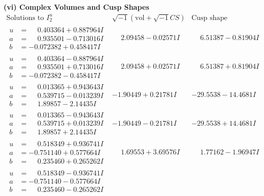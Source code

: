 \documentclass[1p]{elsarticle_modified}
\theoremstyle{definition}
\newcommand{\I}{\sqrt{-1}}
\begin{document}
\newpage\flushleft \textbf{(vi) Complex Volumes and Cusp Shapes}
$$\begin{array}{c|c|c}  
\text{Solutions to }I^u_{2}& \I (\text{vol} + \sqrt{-1}CS) & \text{Cusp shape}\\
 \hline 
\begin{aligned}
u &= \phantom{-}0.403364 + 0.887964 I \\
a &= \phantom{-}0.935501 - 0.713016 I \\
b &= -0.072382 + 0.458417 I\end{aligned}
 & \phantom{-}2.09458 - 0.02571 I & \phantom{-}6.51387 - 0.81904 I \\ \hline\begin{aligned}
u &= \phantom{-}0.403364 - 0.887964 I \\
a &= \phantom{-}0.935501 + 0.713016 I \\
b &= -0.072382 - 0.458417 I\end{aligned}
 & \phantom{-}2.09458 + 0.02571 I & \phantom{-}6.51387 + 0.81904 I \\ \hline\begin{aligned}
u &= \phantom{-}0.013365 + 0.943643 I \\
a &= \phantom{-}0.539715 - 0.013239 I \\
b &= \phantom{-}1.89857 - 2.14435 I\end{aligned}
 & -1.90449 + 0.21781 I & -29.5538 - 14.4681 I \\ \hline\begin{aligned}
u &= \phantom{-}0.013365 - 0.943643 I \\
a &= \phantom{-}0.539715 + 0.013239 I \\
b &= \phantom{-}1.89857 + 2.14435 I\end{aligned}
 & -1.90449 - 0.21781 I & -29.5538 + 14.4681 I \\ \hline\begin{aligned}
u &= \phantom{-}0.518349 + 0.936741 I \\
a &= -0.751140 + 0.577664 I \\
b &= \phantom{-}0.235460 + 0.265262 I\end{aligned}
 & \phantom{-}1.69553 + 3.69576 I & \phantom{-}1.77162 - 1.96947 I \\ \hline\begin{aligned}
u &= \phantom{-}0.518349 - 0.936741 I \\
a &= -0.751140 - 0.577664 I \\
b &= \phantom{-}0.235460 - 0.265262 I\end{aligned}

\end{array}$$
\end{document}
